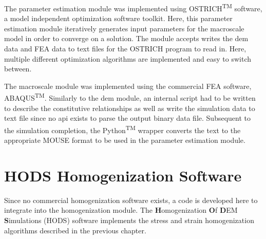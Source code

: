 The parameter estimation module was implemented using OSTRICH\textsuperscript{TM} software, a model independent optimization software toolkit. Here, this parameter estimation module iteratively generates input parameters for the macroscale model in order to converge on a solution. The module accepts writes the \acrshort{dem} data and FEA data to text files for the OSTRICH program to read in. Here, multiple different optimization algorithms are implemented and easy to switch between.

The macroscale module was implemented using the commercial FEA software, ABAQUS\textsuperscript{TM}. Similarly to the \acrshort{dem} module, an internal script had to be written to describe the constitutive relationships as well as write the simulation data to text file since no \acrshort{api} exists to parse the output binary data file. Subsequent to the simulation completion, the Python\textsuperscript{TM} wrapper converts the text to the appropriate MOUSE format to be used in the parameter estimation module.


\section{HODS Homogenization Software}

Since no commercial homogenization software exists, a code is developed here to integrate into the homogenization module. The \textbf{H}omogenization \textbf{O}f \textbf{D}EM \textbf{S}imulations (HODS) software implements the stress and strain homogenization algorithms described in the previous chapter. 


